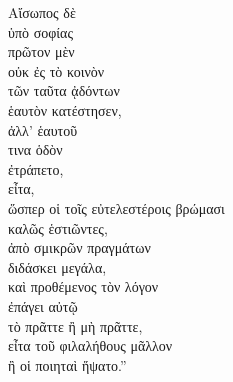 

{\large
\begin{greek}
\noindent Αἴσωπος δὲ \\
\tabto{2em} ὑπὸ σοφίας \\
πρῶτον μὲν \\
\tabto{2em} οὐκ ἐς τὸ κοινὸν \\
\tabto{4em} τῶν ταῦτα ᾀδόντων \\
ἑαυτὸν κατέστησεν, \\
ἀλλ' ἑαυτοῦ \\
\tabto{2em} τινα ὁδὸν \\
\tabto{4em} ἐτράπετο, \\
εἶτα, \\
\tabto{2em} ὥσπερ οἱ τοῖς εὐτελεστέροις βρώμασι \\
\tabto{4em} καλῶς ἑστιῶντες, \\
ἀπὸ σμικρῶν πραγμάτων \\
\tabto{2em} διδάσκει μεγάλα, \\
καὶ προθέμενος τὸν λόγον \\
\tabto{2em} ἐπάγει αὐτῷ \\
\tabto{4em} τὸ πρᾶττε ἢ μὴ πρᾶττε, \\
εἶτα τοῦ φιλαλήθους μᾶλλον \\
\tabto{2em} ἢ οἱ ποιηταὶ ἥψατο.''\\


\end{greek}
}

